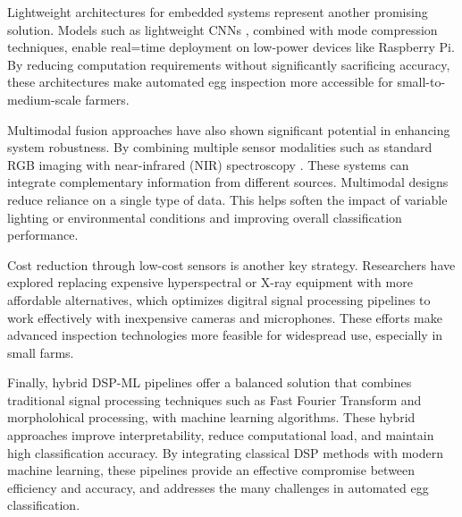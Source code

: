 \documentclass[conference]{IEEEtran}
\begin{document}
	Lightweight architectures for embedded systems represent another promising solution. Models such as lightweight CNNs \cite{chen2022lightweight}, combined with mode compression techniques, enable real=time deployment on low-power devices like Raspberry Pi. By reducing computation requirements without significantly sacrificing accuracy, these architectures make automated egg inspection more accessible for small-to-medium-scale farmers.
	
	Multimodal fusion approaches have also shown significant potential in enhancing system robustness. By combining multiple sensor modalities such as standard RGB imaging with near-infrared (NIR) spectroscopy \cite{garcia2024fusion}. These systems can integrate complementary information from different sources. Multimodal designs reduce reliance on a single type of data. This helps soften the impact of variable lighting or environmental conditions and improving overall classification performance.
	
	Cost reduction through low-cost sensors is another key strategy. Researchers have explored replacing expensive hyperspectral or X-ray equipment with more affordable alternatives, which optimizes digitral signal processing pipelines to work effectively with inexpensive cameras and microphones. These efforts make advanced inspection technologies more feasible for widespread use, especially in small farms.

	Finally, hybrid DSP-ML pipelines offer a balanced solution that combines traditional signal processing techniques such as Fast Fourier Transform and morpholohical processing, with machine learning algorithms. These hybrid approaches improve interpretability, reduce computational load, and maintain high classification accuracy. By integrating classical DSP methods with modern machine learning, these pipelines provide an effective compromise between efficiency and accuracy, and addresses the many challenges in automated egg classification.
	
\end{document}
